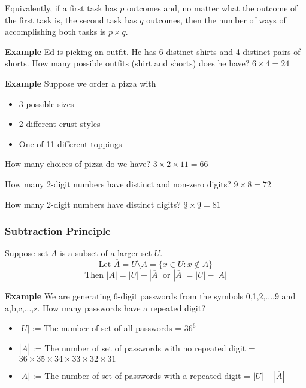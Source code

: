 \documentclass[12pt]{article}
\begin{document}
Equivalently, if a first task has $p$ outcomes and, no matter what the outcome of the first task is, the second task has $q$ outcomes, then the number of ways of accomplishing both tasks is $p\times q$.

\vspace{1\baselineskip}
{\bf Example} Ed is picking an outfit. He has 6 distinct shirts and 4 distinct pairs of shorts. How many possible outfits (shirt and shorts) does he have? $6\times 4 = 24$

\vspace{1\baselineskip}
{\bf Example} Suppose we order a pizza with
\begin{itemize}
    \item 3 possible sizes
    \item 2 different crust styles
    \item One of 11 different toppings
\end{itemize}

How many choices of pizza do we have? $3\times 2 \times 11 = 66$

\vspace{1\baselineskip}
How many 2-digit numbers have distinct and non-zero digits? $\underline{9}\times \underline{8} = 72$

\vspace{1\baselineskip}
How many 2-digit numbers have distinct digits? $\underline{9}\times \underline{9} = 81$

\subsubsection{Subtraction Principle}
Suppose set $A$ is a subset of a larger set $U$.
$$\text{Let } \overline{A} = U \setminus A = \{x\in U: x\notin A\}$$
$$\text{Then } |A| = |U| - |\overline{A}| \text{ or } |\overline{A}| = |U|-|A|$$

{\bf Example} We are generating 6-digit passwords from the symbols 0,1,2,...,9 and a,b,c,...,z. How many passwords have a repeated digit?\\

\begin{itemize}
    \item $|U|$ := The number of set of all passwords = $36^6$
    \item $|\overline{A}|$ := The number of set of passwords with no repeated digit = $36\times 35 \times 34\times 33\times 32\times 31$
    \item $|A|$ := The number of set of passwords with a repeated digit = $|U| - |\overline{A}|$
\end{itemize}
\end{document}
